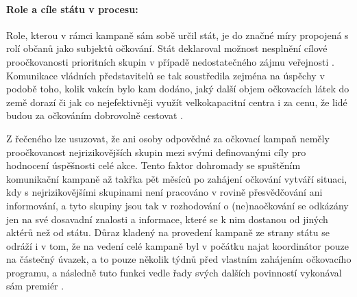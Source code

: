 \paragraph{Role a cíle státu v procesu:} Role, kterou v rámci kampaně sám sobě určil stát, je do značné míry propojená s rolí občanů jako subjektů očkování. Stát deklaroval možnost nesplnění cílové proočkovanosti prioritních skupin v případě nedostatečného zájmu veřejnosti \cite{kdoprvni}. Komunikace vládních představitelů se tak soustředila zejména na úspěchy v podobě toho, kolik vakcín bylo kam dodáno, jaký další objem očkovacích látek do země dorazí či jak co nejefektivněji využít velkokapacitní centra i za cenu, že lidé budou za očkováním dobrovolně cestovat \cite{babis_echo}.

Z řečeného lze usuzovat, že ani osoby odpovědné za očkovací kampaň neměly proočkovanost nejrizikovějších skupin mezi svými definovanými cíly pro hodnocení úspěšnosti celé akce. Tento faktor dohromady 
se spuštěním komunikační kampaně až takřka pět měsíců po zahájení očkování \cite{logoc_naruby,logoc_zpozdeni} vytváří situaci, kdy s nejrizikovějšími skupinami není pracováno v rovině přesvědčování ani informování, a tyto skupiny jsou tak v rozhodování o (ne)naočkování se odkázány jen na své dosavadní znalosti a informace, které se k nim dostanou od jiných aktérů než od státu. Důraz kladený na provedení kampaně ze strany státu se odráží i v tom, že na vedení celé kampaně byl v počátku najat koordinátor pouze na částečný úvazek, a to pouze několik týdnů před vlastním zahájením očkovacího programu, a následně tuto funkci vedle řady svých dalších povinností vykonával sám premiér \cite{ocko_blahuta,babis_koordinator}. %











